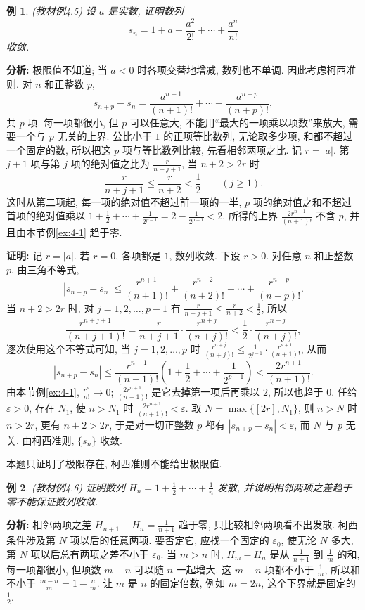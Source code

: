 \documentclass[UTF8,openany]{ctexbook}
\theoremstyle{chinesetextbook}
\newtheorem{example}{例}[section]
\newenvironment{cnproof}{\par\indent\textbf{证明:} \ignorespaces}{\par}
\begin{document}
\begin{example}\label{ex:4-5}
\textnormal{(教材例4.5)} 设 $a$ 是实数, 证明数列
\[
s_n=1+a+\frac{a^2}{2!}+\cdots+\frac{a^n}{n!}
\]
收敛.
\end{example}
\par\indent\textbf{分析:} 极限值不知道; 当 $a<0$ 时各项交替地增减, 数列也不单调. 因此考虑柯西准则. 对 $n$ 和正整数 $p$,
\[
s_{n+p}-s_n=\frac{a^{n+1}}{(n+1)!}+\cdots+\frac{a^{n+p}}{(n+p)!},
\]
共 $p$ 项. 每一项都很小, 但 $p$ 可以任意大, 不能用“最大的一项乘以项数”来放大, 需要一个与 $p$ 无关的上界. 公比小于 $1$ 的正项等比数列, 无论取多少项, 和都不超过一个固定的数, 所以把这 $p$ 项与等比数列比较, 先看相邻两项之比. 记 $r=|a|$. 第 $j+1$ 项与第 $j$ 项的绝对值之比为 $\displaystyle\frac r{n+j+1}$, 当 $n+2>2r$ 时
\[
\frac r{n+j+1}\le\frac r{n+2}<\frac12\qquad(j\ge1).
\]
这时从第二项起, 每一项的绝对值不超过前一项的一半, $p$ 项的绝对值之和不超过首项的绝对值乘以 $\displaystyle1+\frac12+\cdots+\frac1{2^{p-1}}=2-\frac1{2^{p-1}}<2$. 所得的上界 $\displaystyle\frac{2r^{n+1}}{(n+1)!}$ 不含 $p$, 并且由本节例\ref{ex:4-1} 趋于零.
\begin{cnproof}
记 $r=|a|$. 若 $r=0$, 各项都是 $1$, 数列收敛. 下设 $r>0$. 对任意 $n$ 和正整数 $p$, 由三角不等式,
\[
|s_{n+p}-s_n|\le\frac{r^{n+1}}{(n+1)!}+\frac{r^{n+2}}{(n+2)!}+\cdots+\frac{r^{n+p}}{(n+p)!}.
\]
当 $n+2>2r$ 时, 对 $j=1,2,\ldots,p-1$ 有 $\displaystyle\frac r{n+j+1}\le\frac r{n+2}<\frac12$, 所以
\[
\frac{r^{n+j+1}}{(n+j+1)!}=\frac r{n+j+1}\cdot\frac{r^{n+j}}{(n+j)!}<\frac12\cdot\frac{r^{n+j}}{(n+j)!},
\]
逐次使用这个不等式可知, 当 $j=1,2,\ldots,p$ 时 $\displaystyle\frac{r^{n+j}}{(n+j)!}\le\frac1{2^{j-1}}\cdot\frac{r^{n+1}}{(n+1)!}$, 从而
\[
|s_{n+p}-s_n|\le\frac{r^{n+1}}{(n+1)!}\left(1+\frac12+\cdots+\frac1{2^{p-1}}\right)<\frac{2r^{n+1}}{(n+1)!}.
\]
由本节例\ref{ex:4-1}, $\displaystyle\frac{r^n}{n!}\to0$; $\displaystyle\frac{2r^{n+1}}{(n+1)!}$ 是它去掉第一项后再乘以 $2$, 所以也趋于 $0$. 任给 $\varepsilon>0$, 存在 $N_1$, 使 $n>N_1$ 时 $\displaystyle\frac{2r^{n+1}}{(n+1)!}<\varepsilon$. 取 $N=\max\{[2r],N_1\}$, 则 $n>N$ 时 $n>2r$, 更有 $n+2>2r$, 于是对一切正整数 $p$ 都有 $|s_{n+p}-s_n|<\varepsilon$, 而 $N$ 与 $p$ 无关. 由柯西准则, $\{s_n\}$ 收敛.
\end{cnproof}
本题只证明了极限存在, 柯西准则不能给出极限值.
\begin{example}\label{ex:4-6}
\textnormal{(教材例4.6)} 证明数列 $\displaystyle H_n=1+\frac12+\cdots+\frac1n$ 发散, 并说明相邻两项之差趋于零不能保证数列收敛.
\end{example}
\par\indent\textbf{分析:} 相邻两项之差 $\displaystyle H_{n+1}-H_n=\frac1{n+1}$ 趋于零, 只比较相邻两项看不出发散. 柯西条件涉及第 $N$ 项以后的任意两项. 要否定它, 应找一个固定的 $\varepsilon_0$, 使无论 $N$ 多大, 第 $N$ 项以后总有两项之差不小于 $\varepsilon_0$. 当 $m>n$ 时, $H_m-H_n$ 是从 $\displaystyle\frac1{n+1}$ 到 $\displaystyle\frac1m$ 的和, 每一项都很小, 但项数 $m-n$ 可以随 $n$ 一起增大. 这 $m-n$ 项都不小于 $\displaystyle\frac1m$, 所以和不小于 $\displaystyle\frac{m-n}m=1-\frac nm$. 让 $m$ 是 $n$ 的固定倍数, 例如 $m=2n$, 这个下界就是固定的 $\displaystyle\frac12$.
\end{document}
